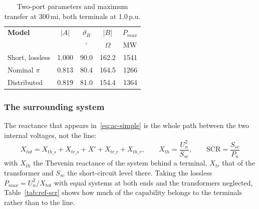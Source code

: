 \begin{table}[!ht]
  \centering
  \begin{tabular}{@{}l r r r r@{}}
    \toprule
    \textbf{Model} & \multicolumn{1}{c}{\textbf{$\left|A\right|$}}
      & \multicolumn{1}{c}{\textbf{$\vartheta_B$}}
      & \multicolumn{1}{c}{\textbf{$\left|B\right|$}}
      & \multicolumn{1}{c}{\textbf{$P_{max}$}} \\
    & & \multicolumn{1}{c}{$^\circ$} & \multicolumn{1}{c}{$\Omega$}
      & \multicolumn{1}{c}{MW} \\
    \midrule
    Short, lossless & 1.000 & 90.0 & 162.2 & 1541 \\
    Nominal $\pi$   & 0.813 & 80.4 & 164.5 & 1266 \\
    Distributed     & 0.819 & 81.0 & 154.4 & 1364 \\
    \bottomrule
  \end{tabular}
  \caption{Two-port parameters and maximum transfer at 300\,mi, both
           terminals at 1.0\,p.u.}
  \label{tab:ref-models}
\end{table}

\subsubsection{The surrounding system}
\label{sec:ref-scr}

The reactance that appears in~\eqref{eq:ac-simple} is the whole path between
the two internal voltages, not the line:
\begin{equation}
  X_{tot} = X_{th\_s} + X_{tr\_s} + X' + X_{tr\_r} + X_{th\_r},
  \qquad
  X_{th} = \frac{U_n^2}{S_{sc}},
  \qquad
  \mathrm{SCR} = \frac{S_{sc}}{P_n}
  \label{eq:ref-xtot}
\end{equation}
with $X_{th}$ the Thevenin reactance of the system behind a terminal, $X_{tr}$
that of the transformer and $S_{sc}$ the short-circuit level there. Taking the
lossless $P_{max} = U_n^2 / X_{tot}$ with equal systems at both ends and the
transformers neglected, Table~\ref{tab:ref-scr} shows how much of the
capability belongs to the terminals rather than to the line.

